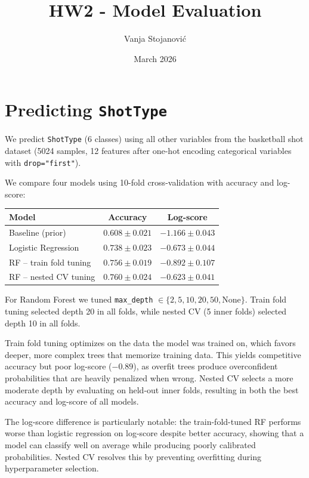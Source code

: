 \documentclass[10pt, a4paper]{article}
\title{\textbf{HW2 - Model Evaluation}}
\author{Vanja Stojanovi\'c}
\date{March 2026}
\begin{document}
\maketitle

\section{Predicting \texttt{ShotType}}

We predict \texttt{ShotType} (6 classes) using all other variables from the basketball shot dataset (5024 samples, 12 features after one-hot encoding categorical variables with \texttt{drop="first"}).

We compare four models using 10-fold cross-validation with accuracy and log-score:

\begin{table}[h]
\centering
\begin{tabular}{lcc}
\toprule
Model & Accuracy & Log-score \\
\midrule
Baseline (prior) & $0.608 \pm 0.021$ & $-1.166 \pm 0.043$ \\
Logistic Regression & $0.738 \pm 0.023$ & $-0.673 \pm 0.044$ \\
RF -- train fold tuning & $0.756 \pm 0.019$ & $-0.892 \pm 0.107$ \\
RF -- nested CV tuning & $0.760 \pm 0.024$ & $-0.623 \pm 0.041$ \\
\bottomrule
\end{tabular}
\end{table}

For Random Forest we tuned \texttt{max\_depth} $\in \{2, 5, 10, 20, 50, \text{None}\}$. Train fold tuning selected depth 20 in all folds, while nested CV (5 inner folds) selected depth 10 in all folds.

Train fold tuning optimizes on the data the model was trained on, which favors deeper, more complex trees that memorize training data. This yields competitive accuracy but poor log-score ($-0.89$), as overfit trees produce overconfident probabilities that are heavily penalized when wrong. Nested CV selects a more moderate depth by evaluating on held-out inner folds, resulting in both the best accuracy and log-score of all models.

The log-score difference is particularly notable: the train-fold-tuned RF performs worse than logistic regression on log-score despite better accuracy, showing that a model can classify well on average while producing poorly calibrated probabilities. Nested CV resolves this by preventing overfitting during hyperparameter selection.
\end{document}
